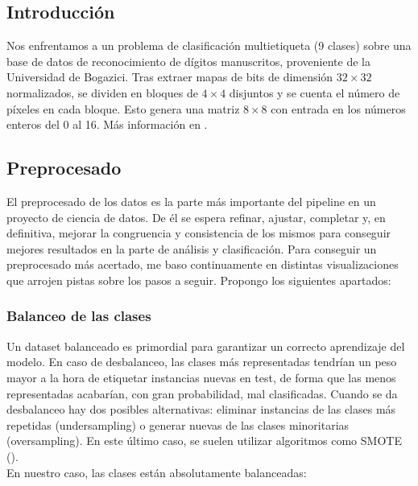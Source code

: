 \subsection{Introducción}

Nos enfrentamos a un problema de clasificación multietiqueta (9 clases) sobre una base de datos de reconocimiento de dígitos manuscritos, proveniente de la Universidad de Bogazici. Tras extraer mapas de bits de dimensión $32\times32$ normalizados, se dividen en bloques de $4\times4$ disjuntos y se cuenta el número de píxeles en cada bloque. Esto genera una matriz $8\times8$ con entrada en los números enteros del 0 al 16. Más información en \cite{optdigits.names}. 

\subsection{Preprocesado}

El preprocesado de los datos es la parte más importante del pipeline en un proyecto de ciencia de datos. De él se espera refinar, ajustar, completar y, en definitiva, mejorar la congruencia y consistencia de los mismos para conseguir mejores resultados en la parte de análisis y clasificación. Para conseguir un preprocesado más acertado, me baso continuamente en distintas visualizaciones que arrojen pistas sobre los pasos a seguir. Propongo los siguientes apartados:

\subsubsection{Balanceo de las clases} 

Un dataset balanceado es primordial para garantizar un correcto aprendizaje del modelo. En caso de desbalanceo, las clases más representadas tendrían un peso mayor a la hora de etiquetar instancias nuevas en test, de forma que las menos representadas acabarían, con gran probabilidad, mal clasificadas. Cuando se da desbalanceo hay dos posibles alternativas: eliminar instancias de las clases más repetidas (undersampling) o generar nuevas de las clases minoritarias (oversampling). En este último caso, se suelen utilizar algoritmos como SMOTE (\cite{smote}). \\

En nuestro caso, las clases están absolutamente balanceadas:

